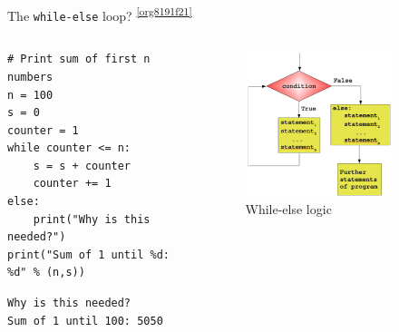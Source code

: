 \documentclass[presentation]{beamer}
\begin{document}
\begin{frame}[label={sec:org3ac6897},fragile]{The \texttt{while-else} loop? \textsuperscript{\ref{org8191f21}}}
 \begin{columns}
\begin{column}{0.48\columnwidth}
\scriptsize
\begin{verbatim}
# Print sum of first n numbers
n = 100
s = 0
counter = 1
while counter <= n:
    s = s + counter
    counter += 1
else:
    print("Why is this needed?")
print("Sum of 1 until %d: %d" % (n,s))
\end{verbatim}

\begin{verbatim}
Why is this needed?
Sum of 1 until 100: 5050
\end{verbatim}
\end{column}

\begin{column}{0.45\columnwidth}
\footnotesize
\begin{figure}[htbp]
\centering
\includegraphics[width=0.8\textwidth]{images/while_loop_with_else.png}
\caption{While-else logic}
\end{figure}
\end{column}
\end{columns}

\end{frame}
\end{document}
